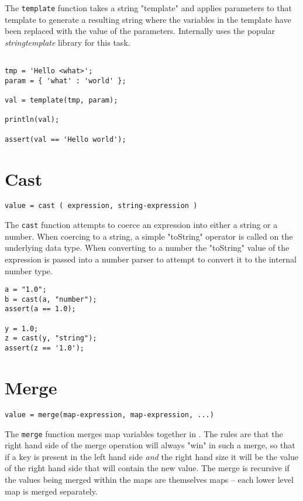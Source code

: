 The \Verb+template+ function takes a string "template" and applies parameters to that template to generate a resulting string where the variables in the template have been replaced with the value of the parameters. Internally \Reflex uses the popular \emph{stringtemplate} library for this task.

\begin{lstlisting}[caption={Template example}]

tmp = 'Hello <what>';
param = { 'what' : 'world' };

val = template(tmp, param);

println(val);

assert(val == 'Hello world');

\end{lstlisting}

\section{Cast}

\begin{Verbatim}
value = cast ( expression, string-expression )
\end{Verbatim}

The \Verb+cast+ function attempts to coerce an expression into either a string or a number. When coercing to a string, a simple "toString" operator is called on the underlying data type. When converting to a number the "toString" value of the expression is passed into a number parser to attempt to convert it to the internal \Reflex number type.

\begin{lstlisting}[caption={Cast example}]
a = "1.0";
b = cast(a, "number");
assert(a == 1.0);

y = 1.0;
z = cast(y, "string");
assert(z == '1.0');

\end{lstlisting}

\section{Merge}
\begin{Verbatim}
value = merge(map-expression, map-expression, ...)
\end{Verbatim}

The \Verb+merge+ function merges map variables together in \Reflex. The rules are that the right hand side of the merge operation will always "win" in such a merge, so that if a key is present in the left hand side \emph{and} the right hand size it will be the value of the right hand side that will contain the new value. The merge is recursive if the values being merged within the maps are themselves maps -- each lower level map is merged separately.

